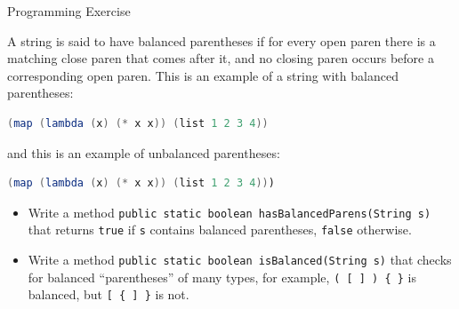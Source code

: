 \documentclass{beamer}
\begin{document}
\begin{frame}[fragile]{Programming Exercise}

A string is said to have balanced parentheses if for every open paren there is a matching close paren that comes after it, and no closing paren occurs before a corresponding open paren.  This is an example of a string with balanced parentheses:
\begin{lstlisting}[language=Java]
(map (lambda (x) (* x x)) (list 1 2 3 4))
\end{lstlisting}
and this is an example of unbalanced parentheses:
\begin{lstlisting}[language=Java]
(map (lambda (x) (* x x)) (list 1 2 3 4)))
\end{lstlisting}
\vspace{-.05in}
\begin{itemize}
\item Write a method {\tt public static boolean hasBalancedParens(String s)} that returns {\tt true} if {\tt s} contains balanced parentheses, {\tt false} otherwise.
\item Write a method {\tt public static boolean isBalanced(String s)} that checks for balanced ``parentheses'' of many types, for example, {\tt ( [ ] ) \{ \}} is balanced, but {\tt  [ \{ ] \}} is not.
\end{itemize}


\end{frame}








\end{document}
